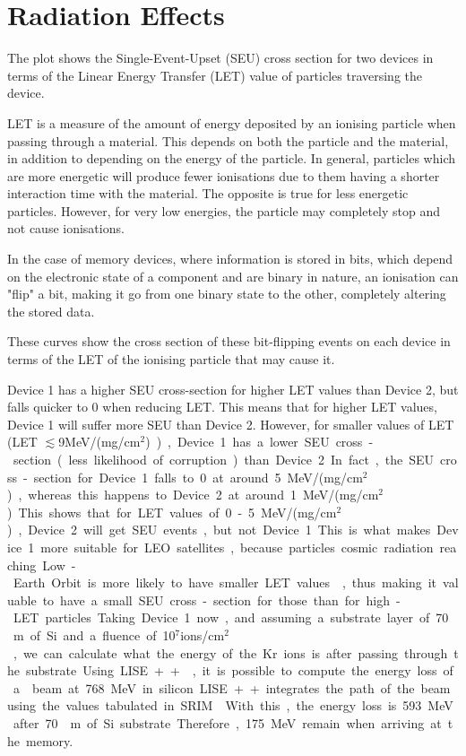 \section{Radiation Effects}
\newcommand{\letunit}{\unit{MeV/(mg/cm$^2$)}}

The plot shows the Single-Event-Upset (SEU) cross section for two devices in terms of the Linear Energy Transfer (LET) value of particles traversing the device. 

LET is a measure of the amount of energy deposited by an ionising particle when passing through a material. This depends on both the particle and the material, in addition to depending on the energy of the particle. In general, particles which are more energetic will produce fewer ionisations due to them having a shorter interaction time with the material. The opposite is true for less energetic particles. However, for very low energies, the particle may completely stop and not cause ionisations. 

In the case of memory devices, where information is stored in bits, which depend on the electronic state of a component and are binary in nature, an ionisation can "flip" a bit, making it go from one binary state to the other, completely altering the stored data. 

These curves show the cross section of these bit-flipping events on each device in terms of the LET of the ionising particle that may cause it.

Device 1 has a higher SEU cross-section for higher LET values than Device 2, but falls quicker to 0 when reducing LET. This means that for higher LET values, Device 1 will suffer more SEU than Device 2. However, for smaller values of LET (LET $\lesssim$9\letunit), Device 1 has a lower SEU cross-section (less likelihood of corruption) than Device 2. In fact, the SEU cross-section for Device 1 falls to 0 at around 5\letunit, whereas this happens to Device 2 at around 1\letunit. This shows that for LET values of 0-5\letunit, Device 2 will get SEU events, but not Device 1. This is what makes Device 1 more suitable for LEO satellites, because particles cosmic radiation reaching Low-Earth Orbit is more likely to have smaller LET values \cite{LEO}, thus making it valuable to have a small SEU cross-section for those than for high-LET particles.

Taking Device 1 now, and assuming a substrate layer of 70\unit{\textmu m} of Si and a fluence of 10$^7$\unit{ions/cm$^2$}, we can calculate what the energy of the Kr ions is after passing through the substrate. Using LISE++ \cite{lise}, it is possible to compute the energy loss of a  beam at 768\unit{MeV} in silicon. LISE++ integrates the path of the beam using the values tabulated in SRIM \cite{srim}. With this, the energy loss is 593\unit{MeV} after 70\unit{\textmu m} of Si substrate. Therefore, 175\unit{MeV} remain when arriving at the memory.

